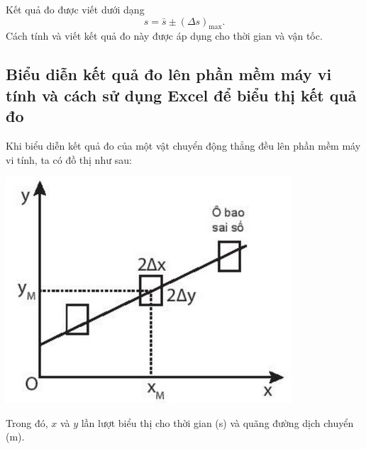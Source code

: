 Kết quả đo được viết dưới dạng  $$s=\bar{s} \pm (\Delta s)_\text{max}.$$
Cách tính và viết kết quả đo này được áp dụng cho thời gian và vận tốc.

\subsection{Biểu diễn kết quả đo lên phần mềm máy vi tính và cách sử dụng Excel để biểu thị kết quả đo}
Khi biểu diễn kết quả đo của một vật chuyển động thẳng đều lên phần mềm máy vi tính, ta có đồ thị như sau:
\begin{center}
	\includegraphics[scale=0.8]{../figs/G10-4-3.png}
\end{center}
Trong đó, $x$ và $y$ lần lượt biểu thị cho thời gian (s) và quãng đường dịch chuyển (m).

